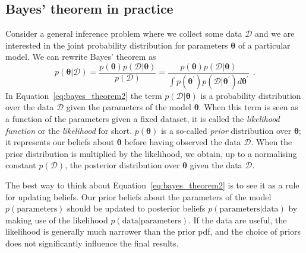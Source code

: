 \documentclass[12pt,dvipsnames]{report}
\renewcommand{\vec}[1]{\boldsymbol{\mathbf{#1}}}
\newcommand{\hquad}{~~}
\begin{document}
\subsection{Bayes' theorem in practice}
\label{ssec:likelihood_function}
Consider a general inference problem where we collect some data $\mathcal{D}$ and we are interested
in the joint probability distribution for parameters $\boldsymbol\theta$ of a particular model.
We can rewrite Bayes' theorem as
\begin{equation}
    p(\vec{\theta} | \mathcal{D})=\frac{p(\vec{\theta}) p(\mathcal{D} | \vec{\theta})}{p(\mathcal{D})}=\frac{p(\vec{\theta}) p(\mathcal{D} | \vec{\theta})}{\int p\left(\vec{\theta}^{\prime}\right) p\left(\mathcal{D} |\vec{\theta}^{\prime}\right) d \vec{\theta}^{\prime}}
    \hquad.
    \label{eq:bayes_theorem2}
\end{equation}
In Equation~\ref{eq:bayes_theorem2} the term $p(\mathcal{D}|\vec{\theta})$  is a probability
distribution over the data $\mathcal{D}$ given the parameters of the model $\vec{\theta}$.
When this term is seen as a function of the parameters given a fixed dataset, it is
called the \emph{likelihood function }  or the \emph{likelihood} for short. $p(\boldsymbol\theta)$
is a so-called \emph{prior} distribution over $\vec{\theta}$; it represents our beliefs
about $\vec{\theta}$ before having observed the data $\mathcal{D}$. When the prior distribution is
multiplied by the likelihood, we obtain, up to a normalising constant $p(\mathcal{D})$, the posterior
distribution over $\vec{\theta}$ given the data $\mathcal{D}$.

The best way to think about Equation~\ref{eq:bayes_theorem2} is to see it as a rule
for updating beliefs. Our prior beliefs about the parameters of the model
$p(\mathrm{parameters})$ should be updated to posterior beliefs $
    p(\mathrm{parameters} | \mathrm{data})$ by making use of the likelihood
$p(\mathrm{data} | \mathrm{parameters})$. If the data are useful, the likelihood is generally
much narrower than the prior pdf, and the choice of priors does not significantly
influence the final results.
\end{document}
